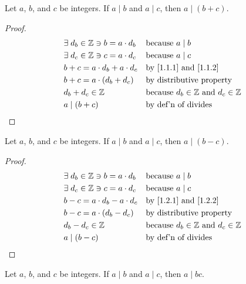 \documentclass[../main.tex]{subfiles}
\begin{document}
\begin{thm} \label{1.1}
Let $a$, $b$, and $c$ be integers. If $a \mid b$ and $a \mid c$, then $a \mid (b + c)$.
\end{thm}

\begin{proof}
\begin{align}
    \label{1.1.1} %
    &\exists \; d_b \in \mathbb{Z} \ni b = a \cdot d_b && \mbox{because } a \mid b \\
    \label{1.1.2}
    &\exists \; d_c \in \mathbb{Z} \ni c = a \cdot d_c && \mbox{because } a \mid c \\
    &b + c = a \cdot d_b + a \cdot d_c && \mbox{by \eqref{1.1.1} and \eqref{1.1.2}} \\
    &b + c = a \cdot (d_b + d_c) && \mbox{by distributive property} \\
    &d_b + d_c \in \mathbb{Z} && \mbox{because } d_b \in \mathbb{Z} \mbox{ and } d_c \in \mathbb{Z} \\
    &a \mid (b + c) && \mbox{by def'n of divides} \qedhere
\end{align}
\end{proof}



\begin{thm} \label{1.2}
Let $a$, $b$, and $c$ be integers. If $a \mid b$ and $a \mid c$, then $a \mid (b - c)$.
\end{thm}

\begin{proof}
\begin{align}
    \label{1.2.1}
    &\exists \; d_b \in \mathbb{Z} \ni b = a \cdot d_b && \mbox{because } a \mid b \\
    \label{1.2.2}
    &\exists \; d_c \in \mathbb{Z} \ni c = a \cdot d_c && \mbox{because } a \mid c \\
    &b - c = a \cdot d_b - a \cdot d_c && \mbox{by \eqref{1.2.1} and \eqref{1.2.2}} \\
    &b - c = a \cdot (d_b - d_c) && \mbox{by distributive property} \\
    &d_b - d_c \in \mathbb{Z} && \mbox{because } d_b \in \mathbb{Z} \mbox{ and } d_c \in \mathbb{Z} \\
    &a \mid (b - c) && \mbox{by def'n of divides} \qedhere
\end{align}
\end{proof}



\begin{thm} \label{1.3}
Let $a$, $b$, and $c$ be integers. If $a \mid b$ and $a \mid c$, then $a \mid bc$.
\end{thm}
\end{document}
